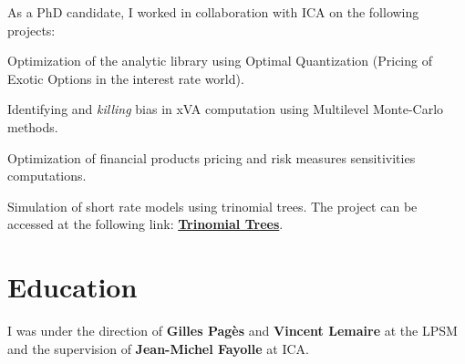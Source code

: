 \documentclass[]{deedy-resume-openfont}
\begin{document}
\sectionsep
\sectionsep


As a PhD candidate, I worked in collaboration with ICA on the following projects:
\vspace{0.1cm}
\begin{tightemize}
	\item[\diamond] Optimization of the analytic library using Optimal Quantization (Pricing of Exotic Options in the interest rate world).
	\item[\diamond] Identifying and \textit{killing} bias in xVA computation using Multilevel Monte-Carlo methods.
\end{tightemize}

\sectionsep
\sectionsep

Optimization of financial products pricing and risk measures sensitivities computations.

\sectionsep
\sectionsep

Simulation of short rate models using trinomial trees. The project can be accessed at the following link: \href{https://simulations.lpsm.paris/trinomial_trees/}{\bf Trinomial Trees}.

\sectionsep

\vspace{\topsep}

\section{Education}
\sectionsep

I was under the direction of \textbf{Gilles Pagès} and \textbf{Vincent Lemaire} at the LPSM and the supervision of \textbf{Jean-Michel Fayolle} at ICA.
\end{document}
